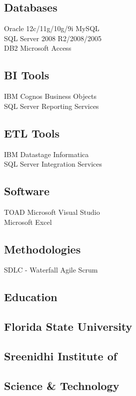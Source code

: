 \documentclass[]{pavan}
\begin{document}
{\begin{minipage}[t]{0.31\textwidth}
\begin{mdframed}[hidealllines=true,backgroundcolor=gray!5]
\sectionsep

\subsection{Databases}
Oracle 12c/11g/10g/9i \textbullet{} MySQL \\
SQL Server 2008 R2/2008/2005\\
DB2 \textbullet{} Microsoft Access

\sectionsep

\subsection{BI Tools}
IBM Cognos \textbullet{}   Business Objects  \\
SQL Server Reporting Services
\sectionsep
\subsection{ETL Tools}
IBM Datastage \textbullet{} Informatica\\
SQL Server Integration Services
\sectionsep

\subsection{Software}
TOAD \textbullet{} Microsoft Visual Studio\\
Microsoft Excel
\sectionsep

\subsection{Methodologies}
SDLC - Waterfall \textbullet{} Agile \textbullet{} Scrum
\end{mdframed}
\vspace{-1.13em}
\begin{mdframed}[hidealllines=true,backgroundcolor=gray!5]
\section{Education} 

\subsection{Florida State University}
\sectionsep

\subsection{Sreenidhi Institute of}
\subsection{Science \& Technology}
\end{mdframed}
\end{minipage} }
\end{document}
